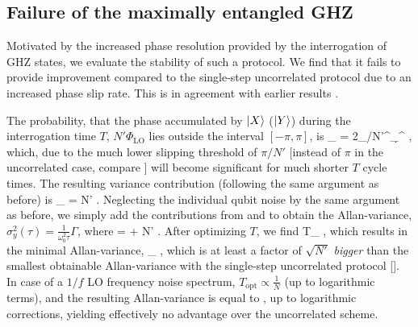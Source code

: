 \subsection{Failure of the maximally entangled GHZ}
Motivated by the increased phase resolution provided by the interrogation of GHZ
states, we evaluate the stability of such a protocol. We find that it fails to
provide improvement compared to the single-step uncorrelated protocol due to an
increased phase slip rate. This is in agreement with earlier results
\cite{Wineland1998,Rosenband2012_numerical}.

The probability, that the phase accumulated by $| X \rangle$ ($| Y \rangle$) during the
interrogation time $T$, $N'\Phi_\mathrm{LO}$ lies outside the interval
$[-\pi,\pi]$, is
\bel
	\PP_ = 2\intop_{\pi/N'}^\infty \d{\Phi_^}
	\exp{},
\eel 
which, due to the much lower slipping threshold of $\pi/N'$ [instead of $\pi$
in the uncorrelated case, compare ] will become significant
for much shorter $T$ cycle times.
The resulting variance contribution (following the same argument as before) is
\bel
	\label{eq:slip_GHZ_1}
	_ = \sqrt{32\pi}
	N'
	\exp{}.
\eel
Neglecting the individual qubit noise by the same argument as before, we simply add the contributions
from  and  to obtain the
Allan-variance, $\sigma_y^2(\tau) = \frac{1}{\omega_0^2\tau} \Gamma$, where
\bel
	\Gamma =   +
	\sqrt{32\pi} N' 
	\exp{}.
\eel
After 
optimizing $T$, we find
\bel
	T_ \approx {}
	,
\eel
which results in the minimal Allan-variance,
_ \approx
	,
\eel
which is at least a factor of $\sqrt{N'}$ \emph{bigger} than the smallest obtainable
Allan-variance with the single-step uncorrelated protocol [].
In case of a $1/f$ LO frequency noise spectrum, $T_\mathrm{opt} \propto
\frac{1}{N}$ (up to logarithmic terms), and the resulting Allan-variance is
equal to , up to logarithmic corrections, yielding
effectively no advantage over the uncorrelated scheme.


